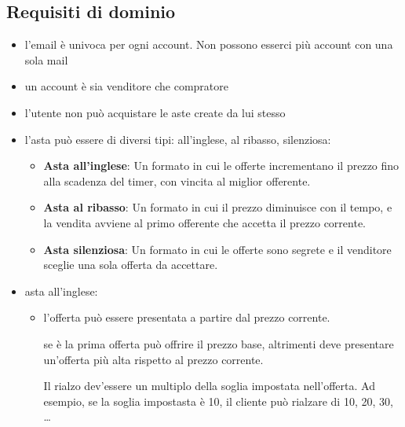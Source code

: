\newpage
\subsection{Requisiti di dominio}
\begin{itemize}
	\item l'email è univoca per ogni account. Non possono esserci più account con una sola mail
	\item un account è sia venditore che compratore
	\item l'utente non può acquistare le aste create da lui stesso
	\item l'asta può essere di diversi tipi: all'inglese, al ribasso, silenziosa:
	      \begin{itemize}[label={\tiny$\blacksquare$}]
		      \item {\sffamily \textbf{Asta all'inglese}}: Un formato in cui le offerte incrementano il prezzo fino alla scadenza del timer, con vincita al miglior offerente.
		      \item {\sffamily \textbf{Asta al ribasso}}: Un formato in cui il prezzo diminuisce con il tempo, e la vendita avviene al primo offerente che accetta il prezzo corrente.
		      \item {\sffamily \textbf{Asta silenziosa}}: Un formato in cui le offerte sono segrete e il venditore sceglie una sola offerta da accettare.
	      \end{itemize}
	\item asta all'inglese:
	      \begin{itemize}[label={\tiny$\blacksquare$}]
		      \item l'offerta può essere presentata a partire dal prezzo corrente.

		            se è la prima offerta può offrire il prezzo base, altrimenti deve presentare un'offerta più alta rispetto al prezzo corrente.

		            Il rialzo dev'essere un multiplo della soglia impostata nell'offerta. Ad esempio, se la soglia impostasta è 10, il cliente può rialzare di 10, 20, 30, \dots


\end{itemize}
\end{itemize}
